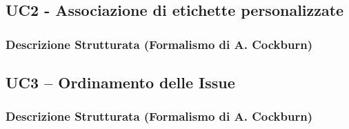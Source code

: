 \subsection{UC2 - Associazione di etichette personalizzate}
\subsubsection{Descrizione Strutturata (Formalismo di A. Cockburn)}
\begin{center}
    
    
\end{center}

\subsection{UC3 – Ordinamento delle Issue}
\subsubsection{Descrizione Strutturata (Formalismo di A. Cockburn)}
\begin{center}


\end{center}
